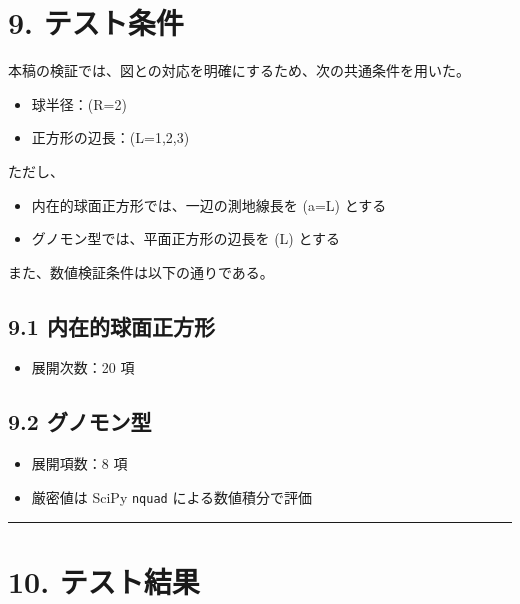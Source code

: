 \documentclass[
  12pt,
  a4paper,
]{article}
\providecommand{\tightlist}{%
  \setlength{\itemsep}{0pt}\setlength{\parskip}{0pt}}
\begin{document}
\section{9. テスト条件}\label{ux30c6ux30b9ux30c8ux6761ux4ef6}

本稿の検証では、図との対応を明確にするため、次の共通条件を用いた。

\begin{itemize}
\tightlist
\item
  球半径：(R=2)
\item
  正方形の辺長：(L=1,2,3)
\end{itemize}

ただし、

\begin{itemize}
\tightlist
\item
  内在的球面正方形では、一辺の測地線長を (a=L) とする
\item
  グノモン型では、平面正方形の辺長を (L) とする
\end{itemize}

また、数値検証条件は以下の通りである。

\subsection{9.1
内在的球面正方形}\label{ux5185ux5728ux7684ux7403ux9762ux6b63ux65b9ux5f62-2}

\begin{itemize}
\tightlist
\item
  展開次数：20 項
\end{itemize}

\subsection{9.2 グノモン型}\label{ux30b0ux30ceux30e2ux30f3ux578b}

\begin{itemize}
\tightlist
\item
  展開項数：8 項
\item
  厳密値は SciPy \texttt{nquad} による数値積分で評価
\end{itemize}

\begin{center}\rule{0.5\linewidth}{0.5pt}\end{center}

\section{10. テスト結果}\label{ux30c6ux30b9ux30c8ux7d50ux679c}
\end{document}
